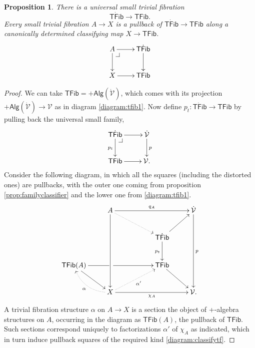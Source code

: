 \documentclass[12pt]{article}
\makeatletter
\newcommand{\pbcorner}[1][dr]{\save*!/#1-1.2pc/#1:(-1,1)@^{|-}\restore}
\newcommand{\ra}{\ensuremath{\rightarrow}}
\newcommand{\V}{\ensuremath{\mathcal{V}}}
\newcommand{\VV}{\ensuremath{\dot{\mathcal{V}}}}
\newcommand{\TFib}{\ensuremath{\mathsf{TFib}}}
\newcommand{\TTFib}{\ensuremath{\dot{\mathsf{TFib}}}}
\newtheorem{proposition}[theorem]{Proposition}
\theoremstyle{remark}
\theoremstyle{definition}
\makeatother
\begin{document}
\begin{proposition}\label{prop:classTFib}
There is a \emph{universal small trivial fibration}  $$\TTFib\ra\TFib.$$  Every small trivial fibration $A \ra X$ is a pullback of $\TTFib\ra\TFib$ along a canonically determined classifying map $X\ra \TFib$.
\begin{equation}\label{diagram:classifytf}
\xymatrix{
A \ar[d] \ar[r]  \pbcorner & \TTFib\ar[d]\\
X \ar[r] & \TFib
}
\end{equation}
\end{proposition}

\begin{proof}
We can take $\TFib = +\mathsf{Alg}(\VV) $, which comes with its projection $+\mathsf{Alg}(\VV) \ra \V$ as in diagram \eqref{diagram:tfib1}.  Now define $p_t:\TTFib\ra\TFib$ by pulling back the universal small family,
\[
\xymatrix{
\TTFib \ar[d]_{p_t} \ar[r]  \pbcorner & \VV\ar[d]^p\\
\TFib \ar[r] & \V.
}
\]
Consider the following diagram, in which all the squares (including the distorted ones) are pullbacks, with the outer one coming from proposition \ref{prop:familyclassifier} and the lower one from \eqref{diagram:tfib1}.
\begin{equation}\label{diagram:classifytf2}
\xymatrix{
&A \ar[ddd] \ar[rrr]^{q_A}   \ar@{.>}[rrd] &&& \VV\ar[ddd]^p\\
& && \TTFib \ar[d]_{p_t} \ar[ru]  &\\
\TFib(A) \ar[rd] \ar[rrr] |<<<<<<<<<<<<\hole  &&& \TFib \ar[rd] &\\
&X \ar[rrr]_{\chi_A} \ar@{.>}@/^1pc/[lu]^\alpha \ar@{.>}[rru]_{\alpha'} &&& \V.
}
\end{equation}
A trivial fibration structure $\alpha$ on $A\ra X$ is a section the object of +-algebra structures on $A$, occurring in the diagram as $\TFib(A)$, the pullback of $\TFib$.  Such sections correspond uniquely to factorizations $\alpha'$ of $\chi_A$ as indicated, which in turn induce pullback squares of the required kind \eqref{diagram:classifytf}.


\end{proof}
\end{document}
